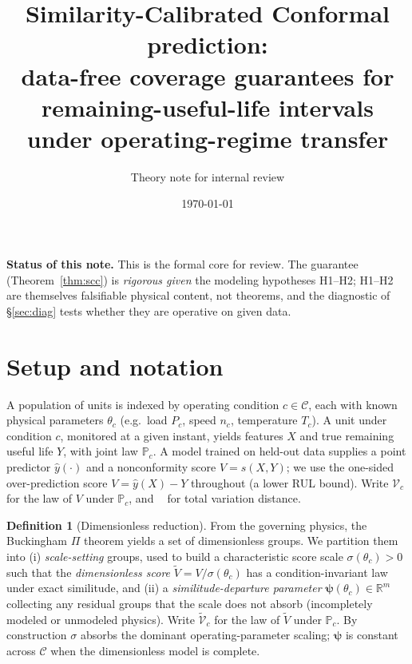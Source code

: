 \documentclass[11pt]{article}
\title{Similarity-Calibrated Conformal prediction:\\
data-free coverage guarantees for remaining-useful-life intervals under operating-regime transfer}
\author{Theory note for internal review}
\date{\today}
\theoremstyle{definition}
\newtheorem{definition}{Definition}
\theoremstyle{remark}
\DeclareMathOperator{\dtv}{d_{\mathrm{TV}}}
\newcommand{\law}[1]{\mathcal{V}_{#1}}
\newcommand{\lawt}[1]{\tilde{\mathcal{V}}_{#1}}
\begin{document}
\maketitle

\noindent\textbf{Status of this note.} This is the formal core for review. The
guarantee (Theorem~\ref{thm:scc}) is \emph{rigorous given} the modeling hypotheses
H1--H2; H1--H2 are themselves falsifiable physical content, not theorems, and the
diagnostic of \S\ref{sec:diag} tests whether they are operative on given data.

\section{Setup and notation}
A population of units is indexed by operating condition $c\in\mathcal C$, each with
known physical parameters $\theta_c$ (e.g.\ load $P_c$, speed $n_c$, temperature $T_c$).
A unit under condition $c$, monitored at a given instant, yields features $X$ and true
remaining useful life $Y$, with joint law $\mathbb P_c$. A model trained on held-out
data supplies a point predictor $\hat y(\cdot)$ and a nonconformity score $V=s(X,Y)$;
we use the one-sided over-prediction score $V=\hat y(X)-Y$ throughout (a lower RUL
bound). Write $\law c$ for the law of $V$ under $\mathbb P_c$, and $\dtv$ for total
variation distance.

\begin{definition}[Dimensionless reduction]\label{def:pi}
From the governing physics, the Buckingham $\Pi$ theorem yields a set of dimensionless
groups. We partition them into (i) \emph{scale-setting} groups, used to build a
characteristic score scale $\sigma(\theta_c)>0$ such that the \emph{dimensionless
score} $\tilde V=V/\sigma(\theta_c)$ has a condition-invariant law under exact
similitude, and (ii) a \emph{similitude-departure parameter}
$\boldsymbol\psi(\theta_c)\in\mathbb R^m$ collecting any residual groups that the scale
does not absorb (incompletely modeled or unmodeled physics). Write $\lawt c$ for the
law of $\tilde V$ under $\mathbb P_c$. By construction $\sigma$ absorbs the dominant
operating-parameter scaling; $\boldsymbol\psi$ is constant across $\mathcal C$ when the
dimensionless model is complete.
\end{definition}
\end{document}
